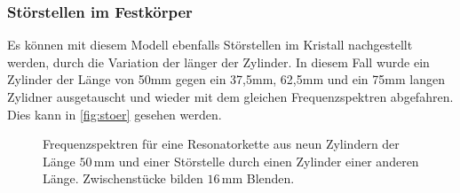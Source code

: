 \subsubsection{Störstellen im Festkörper}
Es können mit diesem Modell ebenfalls Störstellen im Kristall nachgestellt werden, durch die Variation der länger der Zylinder. In diesem Fall wurde ein Zylinder der Länge
von 50mm gegen ein 37,5mm, 62,5mm und ein 75mm langen Zylidner ausgetauscht und wieder mit dem gleichen Frequenzspektren abgefahren. Dies kann in \autoref{fig:stoer} gesehen werden.

\begin{figure}[H]
    \centering
    \hfil
    \hfil 
    \caption{Frequenzspektren für eine Resonatorkette aus neun Zylindern der Länge $50\,$mm und einer Störstelle durch einen Zylinder einer anderen Länge. Zwischenstücke bilden $16\,$mm Blenden.}
    \label{fig:fest_stoer}
\end{figure}

